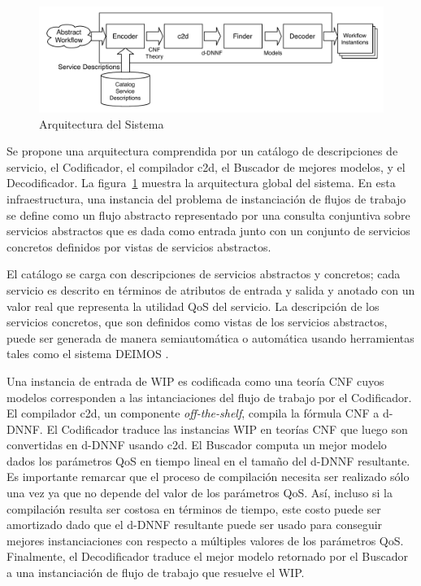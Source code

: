 \begin{figure}[t]
\centering
\includegraphics[width=.9\textwidth]{graphics/architecture}
\caption{Arquitectura del Sistema}
\label{fig:architecture}
\end{figure}

Se propone una arquitectura comprendida por un catálogo de descripciones de
servicio, el Codificador, el compilador c2d, el Buscador de mejores modelos, y
el Decodificador. La figura~\ref{fig:architecture} muestra la arquitectura global del sistema.
En esta infraestructura, una instancia del problema de instanciación de flujos
de trabajo se define como un flujo abstracto representado por una consulta
conjuntiva sobre servicios abstractos que es dada como entrada junto con un
conjunto de servicios concretos definidos por vistas de servicios abstractos.

El catálogo se carga con descripciones de servicios abstractos y concretos; cada
servicio es descrito en términos de atributos de entrada y salida y anotado con
un valor real que representa la utilidad QoS del servicio. La descripción de los
servicios concretos, que son definidos como vistas de los servicios abstractos,
puede ser generada de manera semiautomática o automática usando herramientas
tales como el sistema DEIMOS \cite{AmbiteISWC09}.

Una instancia de entrada de WIP es codificada como una teoría CNF cuyos modelos
corresponden a las intanciaciones del flujo de trabajo por el Codificador. El
compilador c2d, un componente \emph{off-the-shelf}, compila la fórmula CNF a
d-DNNF. El Codificador traduce las instancias WIP en teorías CNF que luego son
convertidas en d-DNNF usando c2d. El Buscador computa un mejor modelo dados los
parámetros QoS en tiempo lineal en el tamaño del d-DNNF resultante. Es
importante remarcar que el proceso de compilación necesita ser realizado sólo
una vez ya que no depende del valor de los parámetros QoS. Así, incluso si la
compilación resulta ser costosa en términos de tiempo, este costo puede ser
amortizado dado que el d-DNNF resultante puede ser usado para conseguir mejores
instanciaciones con respecto a múltiples valores de los parámetros QoS.
Finalmente, el Decodificador traduce el mejor modelo retornado por el Buscador
a una instanciación de flujo de trabajo que resuelve el WIP.

